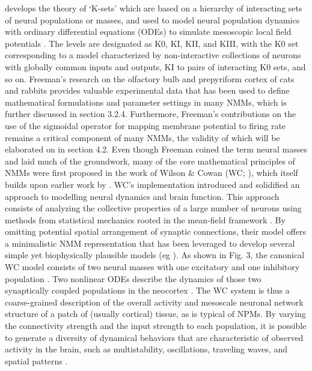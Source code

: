 \documentclass[12pt,twoside]{article}
\begin{document}
develops the theory of `K-sets' which are based on a hierarchy of interacting sets of neural populations or masses, and used to model neural population dynamics with ordinary differential equations (ODEs) to simulate mesoscopic local field potentials \citep{deschle2021validity}. The levels are designated as K0, KI, KII, and KIII, with the K0 set corresponding to a model characterized by non-interactive collections of neurons with globally common inputs and outputs, KI to pairs of interacting K0 sets, and so on. Freeman's research on the olfactory bulb and prepyriform cortex of cats and rabbits \citep{freeman1979nonlinear, freeman1975mass} provides valuable experimental data that has been used to define mathematical formulations and parameter settings in many NMMs, which is further discussed in section 3.2.4. Furthermore, Freeman's contributions on the use of the sigmoidal operator for mapping membrane potential to firing rate remains a critical component of many NMMs, the validity of which will be elaborated on in section 4.2. Even though Freeman coined the term neural masses and laid much of the groundwork, many of the core mathematical principles of NMMs were first proposed in the work of Wilson \& Cowan (WC; \citealp{wilson1972excitatory}), which itself builds upon earlier work by \citet{beurle1956properties}. WC's implementation introduced and solidified an approach to modelling neural dynamics and brain function. This approach consists of analyzing the collective properties of a large number of neurons using methods from statistical mechanics rooted in the mean-field framework \citep{destexhe2009wilson,chow2020before}. By omitting potential spatial arrangement of synaptic connections, their model offers a minimalistic NMM representation that has been leveraged to develop several simple yet biophysically plausible models (eg \citealp{Kilpatrick2013, sanz2015mathematical}). As shown in Fig. 3, the canonical WC model consists of two neural masses with one excitatory and one inhibitory population \citep{wilson1972excitatory,sanz2015mathematical}. Two nonlinear ODEs describe the dynamics of those two synaptically coupled populations in the neocortex \citep{nakagawa2014delays,cowan2016wilson}. The WC system is thus a coarse-grained description of the overall activity and mesoscale neuronal network structure of a patch of (usually cortical) tissue, as is typical of NPMs. By varying the connectivity strength and the input strength to each population, it is possible to generate a diversity of dynamical behaviors that are characteristic of observed activity in the brain, such as multistability, oscillations, traveling waves, and spatial patterns \citep{Kilpatrick2013}. 
\end{document}
